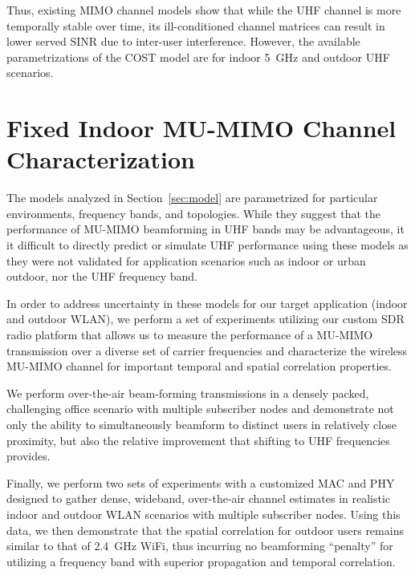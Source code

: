 Thus, existing MIMO channel models show that while the UHF channel is more temporally stable over time, its ill-conditioned channel matrices can result in lower served SINR due to inter-user interference. 
However, the available parametrizations of the COST model are for indoor 5~GHz  and outdoor UHF scenarios.  

\section{Fixed Indoor MU-MIMO Channel Characterization}
\label{sec:mumimo_channels} 

The models analyzed in Section~\ref{sec:model} are parametrized for particular environments, frequency bands, and topologies. While they suggest that the performance of \ac{MU-MIMO} beamforming in UHF bands may be advantageous, it it difficult to directly predict or simulate UHF performance using these models as they were not validated for application scenarios such as indoor or urban outdoor, nor the UHF frequency band.

In order to address uncertainty in these models for our target application (indoor and outdoor \ac{WLAN}), we perform a set of  experiments utilizing our custom \ac{SDR} radio platform that allows us to measure the performance of a \ac{MU-MIMO} transmission over a diverse set of carrier frequencies and characterize the wireless \ac{MU-MIMO} channel for important temporal and spatial correlation properties.

We perform over-the-air beam-forming transmissions in a densely packed, challenging office scenario with multiple subscriber nodes and demonstrate not only the ability to simultaneously beamform to distinct users in relatively close proximity, but also the relative improvement that shifting to UHF frequencies provides.

Finally, we perform two sets of experiments with a customized MAC and PHY designed to gather dense, wideband, over-the-air channel estimates in realistic indoor and outdoor \ac{WLAN} scenarios with multiple subscriber nodes. Using this data, we then demonstrate that the spatial correlation for outdoor users remains similar to that of 2.4~GHz WiFi, thus incurring no beamforming ``penalty'' for utilizing a frequency band with superior propagation and temporal correlation.

